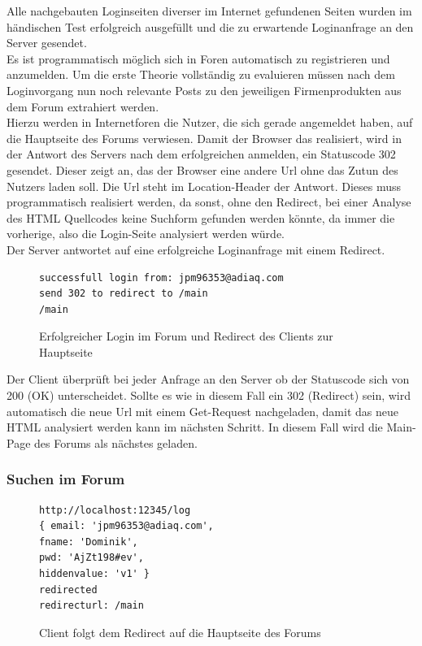 Alle nachgebauten Loginseiten diverser im Internet gefundenen Seiten wurden im händischen Test erfolgreich ausgefüllt und die zu erwartende Loginanfrage an den Server gesendet.\\
Es ist programmatisch möglich sich in Foren automatisch zu registrieren und anzumelden. Um die erste Theorie vollständig zu evaluieren müssen nach dem Loginvorgang nun noch relevante Posts zu den jeweiligen Firmenprodukten aus dem Forum extrahiert werden.\\
Hierzu werden in Internetforen die Nutzer, die sich gerade angemeldet haben, auf die Hauptseite des Forums verwiesen. Damit der Browser das realisiert, wird in der Antwort des Servers nach dem erfolgreichen anmelden, ein Statuscode 302 gesendet. Dieser zeigt an, das der Browser eine andere Url ohne das Zutun des Nutzers laden soll. Die Url steht im Location-Header der Antwort. Dieses muss programmatisch realisiert werden, da sonst, ohne den Redirect, bei einer Analyse des HTML Quellcodes keine Suchform gefunden werden könnte, da immer die vorherige, also die Login-Seite analysiert werden würde.\\
Der Server antwortet auf eine erfolgreiche Loginanfrage mit einem Redirect.

\begin{figure}[ht]
\begin{lstlisting}[language=HTML5]
successfull login from: jpm96353@adiaq.com
send 302 to redirect to /main
/main
\end{lstlisting}
\caption{Erfolgreicher Login im Forum und Redirect des Clients zur Hauptseite}
\end{figure}

Der Client überprüft bei jeder Anfrage an den Server ob der Statuscode sich von 200 (OK) unterscheidet. Sollte es wie in diesem Fall ein 302 (Redirect) sein, wird automatisch die neue Url mit einem Get-Request nachgeladen, damit das neue HTML analysiert werden kann im nächsten Schritt. In diesem Fall wird die Main- Page des Forums als nächstes geladen.

\newpage

\subsubsection{Suchen im Forum}
\begin{figure}[ht]
\begin{lstlisting}[language=HTML5]
http://localhost:12345/log
{ email: 'jpm96353@adiaq.com',
fname: 'Dominik',
pwd: 'AjZt198#ev',
hiddenvalue: 'v1' }
redirected
redirecturl: /main
\end{lstlisting}
\caption{Client folgt dem Redirect auf die Hauptseite des Forums}
\end{figure}

